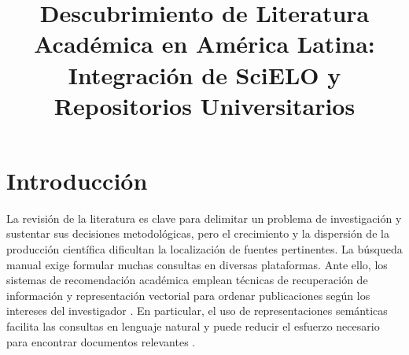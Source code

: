 \documentclass[conference]{IEEEtran}
\begin{document}
\title{Descubrimiento de Literatura Académica en América Latina: Integración de SciELO y Repositorios Universitarios\\
}

\author{
\and{}
}
\maketitle




\section{Introducción}


La revisión de la literatura es clave para delimitar un problema de investigación y sustentar sus decisiones metodológicas, pero el crecimiento y la dispersión de la producción científica dificultan la localización de fuentes pertinentes. La búsqueda manual exige formular muchas consultas en diversas plataformas. Ante ello, los sistemas de recomendación académica emplean técnicas de recuperación de información y representación vectorial para ordenar publicaciones según los intereses del investigador \cite{b1}. En particular, el uso de representaciones semánticas facilita las consultas en lenguaje natural y puede reducir el esfuerzo necesario para encontrar documentos relevantes \cite{b3}.
\end{document}

